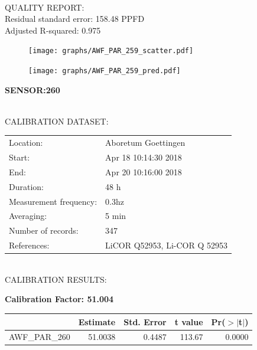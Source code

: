 \documentclass[oneside]{report}
\begin{document}
\hrulefill\\
QUALITY REPORT:\\
Residual standard error: 158.48 PPFD\\
Adjusted R-squared: 0.975



\begin{figure}[H]
  \centering
  \texttt{[image: graphs/AWF\_PAR\_259\_scatter.pdf]}
\end{figure}




\begin{figure}[H]
  \centering
  \texttt{[image: graphs/AWF\_PAR\_259\_pred.pdf]}
\end{figure}

\pagebreak


\begin{center}
\large{\textbf{SENSOR:260}}\\
\end{center}

\hrulefill\\
CALIBRATION DATASET:\\
\begin{table}[h!]
  \centering
  \label{tab:table1}
  \begin{tabular}{ll}
    Location: & Aboretum Goettingen\\ 
    
    
    Start:  & Apr 18 10:14:30 2018 \\
    End:   & Apr 20 10:16:00 2018\\ 
    Duration: & 48 h\\
    Measurement frequency: & 0.3hz\\
    Averaging:  &5 min\\
    Number of records: & 347 \\
    References: & LiCOR Q52953, Li-COR Q 52953 \\
  \end{tabular}
\end{table}

\hrulefill\\
CALIBRATION RESULTS:\\


\begin{center}
\textbf{\large{Calibration Factor: 51.004}}\\
\end{center}
\begin{table}[ht]
\centering
\begin{tabular}{rrrrr}
  \hline
 & Estimate & Std. Error & t value & Pr($>$$|$t$|$) \\ 
  \hline
AWF\_PAR\_260 & 51.0038 & 0.4487 & 113.67 & 0.0000 \\ 
   \hline
\end{tabular}
\end{table}
\end{document}
